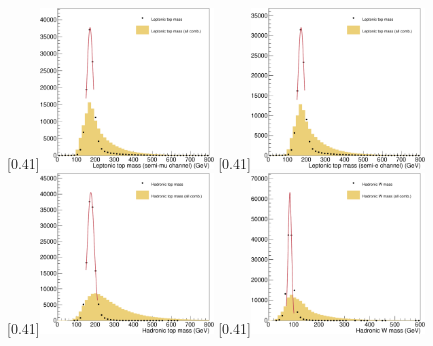 \begin{figure}[p] \centering
    \subcaptionbox{}[0.41\textwidth]{\includegraphics[width=0.41\textwidth]{chapitre6/figs/chi2/chi2_discrimant_combinations_leptonic_top_mass_mu.pdf}} \qquad
    \subcaptionbox{}[0.41\textwidth]{\includegraphics[width=0.41\textwidth]{chapitre6/figs/chi2/chi2_discrimant_combinations_leptonic_top_mass_e.pdf}} \\
    \subcaptionbox{}[0.41\textwidth]{\includegraphics[width=0.41\textwidth]{chapitre6/figs/chi2/chi2_discrimant_combinations_hadronic_top_mass.pdf}} \qquad
    \subcaptionbox{}[0.41\textwidth]{\includegraphics[width=0.41\textwidth]{chapitre6/figs/chi2/chi2_discrimant_combinations_w_mass.pdf}} \\

\end{figure}
